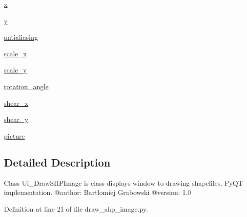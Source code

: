 \begin{DoxyCompactItemize}
\item 
\hyperlink{classsrc_1_1client_1_1gui_1_1draw__shp__image_1_1Ui__DrawSHPImage_a754411b3416ec6e1a300ce0bf8331f53}{x}
\item 
\hyperlink{classsrc_1_1client_1_1gui_1_1draw__shp__image_1_1Ui__DrawSHPImage_ac28bab29b487e5025e70ab68ac647405}{y}
\item 
\hyperlink{classsrc_1_1client_1_1gui_1_1draw__shp__image_1_1Ui__DrawSHPImage_a1cdcd0090130940b7e14e74a51bcdae5}{antialiasing}
\item 
\hyperlink{classsrc_1_1client_1_1gui_1_1draw__shp__image_1_1Ui__DrawSHPImage_a108c971ae43d77117cc962d5a736b460}{scale\_\-x}
\item 
\hyperlink{classsrc_1_1client_1_1gui_1_1draw__shp__image_1_1Ui__DrawSHPImage_ac690747ea55189ac5d1fbc79fb000007}{scale\_\-y}
\item 
\hyperlink{classsrc_1_1client_1_1gui_1_1draw__shp__image_1_1Ui__DrawSHPImage_a21c383ea2d3d297b6eaa3028856468ac}{rotation\_\-angle}
\item 
\hyperlink{classsrc_1_1client_1_1gui_1_1draw__shp__image_1_1Ui__DrawSHPImage_ab5db866044bab9d8d1ec2d5330a134c0}{shear\_\-x}
\item 
\hyperlink{classsrc_1_1client_1_1gui_1_1draw__shp__image_1_1Ui__DrawSHPImage_a48234df8413f17bde91a902f25127e68}{shear\_\-y}
\item 
\hyperlink{classsrc_1_1client_1_1gui_1_1draw__shp__image_1_1Ui__DrawSHPImage_a5c6c6d16152efba6263e1a186abea010}{picture}
\end{DoxyCompactItemize}


\subsection{Detailed Description}
\begin{DoxyVerb}
Class Ui_DrawSHPImage is class displays window to drawing shapefiles. PyQT implementation.
@author: Bartlomiej Grabowski
@version: 1.0
\end{DoxyVerb}
 

Definition at line 21 of file draw\_\-shp\_\-image.py.



